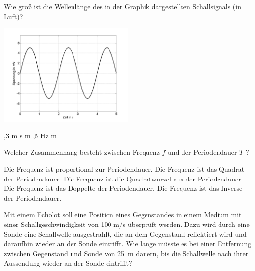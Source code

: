\documentclass[11pt]{exam}
\begin{document}
\setlength{\voffset}{-0.5in}
\setlength{\headsep}{5pt}

\hspace{2mm}
 \hspace{5mm}
\vspace{4mm}

\begin{questions}

\question Wie groß ist die Wellenlänge des in der Graphik dargestellten Schallsignals (in Luft)? 

\includegraphics[width=0.5\textwidth]{../../../questions/J/images/SchallSinus2.png}

\begin{choices}
	,3 m
	 s
	 m
	,5 Hz
	 m
\end{choices}

\vspace{3mm}\question Welcher Zusammenhang besteht zwischen Frequenz \( f \) und der Periodendauer \( T \) ?

\begin{choices}
	\choice Die Frequenz ist proportional zur Periodendauer.
	\choice Die Frequenz ist das Quadrat der Periodendauer.
	\choice Die Frequenz ist die Quadratwurzel aus der Periodendauer.
	\choice Die Frequenz ist das Doppelte der Periodendauer.
	\choice Die Frequenz ist das Inverse der Periodendauer.
\end{choices}

\vspace{3mm}\question Mit einem Echolot soll eine Position eines Gegenstandes in einem Medium mit einer Schallgeschwindigkeit von 100 m/s überprüft werden. Dazu wird durch eine Sonde eine Schallwelle ausgestrahlt, die an dem Gegenstand reflektiert wird und daraufhin wieder an der Sonde eintrifft. Wie lange müsste es bei einer Entfernung zwischen Gegenstand und Sonde von 25~m dauern, bis die Schallwelle nach ihrer Aussendung wieder an der Sonde eintrifft?


\end{questions}
\end{document}
